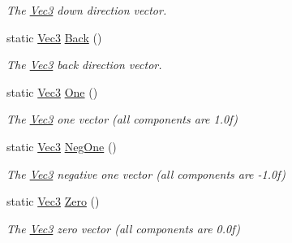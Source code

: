 \begin{DoxyCompactItemize}
\begin{DoxyCompactList}\small\item\em The \hyperlink{classgfxmath_1_1_vec3}{Vec3} down direction vector. \end{DoxyCompactList}\item 
\hypertarget{classgfxmath_1_1_vec3_a94003806766a3d07d990b84dff8e4ad1}{}static \hyperlink{classgfxmath_1_1_vec3}{Vec3} \hyperlink{classgfxmath_1_1_vec3_a94003806766a3d07d990b84dff8e4ad1}{Back} ()\label{classgfxmath_1_1_vec3_a94003806766a3d07d990b84dff8e4ad1}

\begin{DoxyCompactList}\small\item\em The \hyperlink{classgfxmath_1_1_vec3}{Vec3} back direction vector. \end{DoxyCompactList}\item 
\hypertarget{classgfxmath_1_1_vec3_ae1a85b58e09558b6c218c5410519c195}{}static \hyperlink{classgfxmath_1_1_vec3}{Vec3} \hyperlink{classgfxmath_1_1_vec3_ae1a85b58e09558b6c218c5410519c195}{One} ()\label{classgfxmath_1_1_vec3_ae1a85b58e09558b6c218c5410519c195}

\begin{DoxyCompactList}\small\item\em The \hyperlink{classgfxmath_1_1_vec3}{Vec3} one vector (all components are 1.\+0f) \end{DoxyCompactList}\item 
\hypertarget{classgfxmath_1_1_vec3_abc7e46a2a66e7923b80b3c0526eaccc1}{}static \hyperlink{classgfxmath_1_1_vec3}{Vec3} \hyperlink{classgfxmath_1_1_vec3_abc7e46a2a66e7923b80b3c0526eaccc1}{Neg\+One} ()\label{classgfxmath_1_1_vec3_abc7e46a2a66e7923b80b3c0526eaccc1}

\begin{DoxyCompactList}\small\item\em The \hyperlink{classgfxmath_1_1_vec3}{Vec3} negative one vector (all components are -\/1.\+0f) \end{DoxyCompactList}\item 
\hypertarget{classgfxmath_1_1_vec3_a38cb4d3cc046d2b302d4931160eddd96}{}static \hyperlink{classgfxmath_1_1_vec3}{Vec3} \hyperlink{classgfxmath_1_1_vec3_a38cb4d3cc046d2b302d4931160eddd96}{Zero} ()\label{classgfxmath_1_1_vec3_a38cb4d3cc046d2b302d4931160eddd96}

\begin{DoxyCompactList}\small\item\em The \hyperlink{classgfxmath_1_1_vec3}{Vec3} zero vector (all components are 0.\+0f) \end{DoxyCompactList}\end{DoxyCompactItemize}
